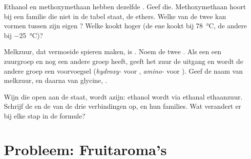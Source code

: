 \begin{exercise}[$\star\star\star$]\label{exo:g11:functional-groups:13}
Ethanol  en methoxymethaan  hebben dezelfde
. Geef die. Methoxymethaan hoort bij een familie die niet
in de tabel staat, de ethers. Welke van de twee kan 
vormen tussen zijn eigen ? Welke kookt hoger (de ene kookt bij
\qty{78}{\celsius}, de andere bij \qty{-25}{\celsius})?
\end{exercise}

\begin{exercise}[$\star\star\star$]\label{exo:g11:functional-groups:14}
Melkzuur, dat vermoeide spieren maken, is
. Noem de twee . Als
een  een zuurgroep en nog een andere groep heeft, geeft het zuur
de uitgang en wordt de andere groep een voorvoegsel (\emph{hydroxy-} voor
, \emph{amino-} voor ). Geef de naam van melkzuur, en
daarna van glycine, .
\end{exercise}

\begin{exercise}[$\star\star\star$]\label{exo:g11:functional-groups:15}
Wijn die open aan de  staat, wordt azijn: ethanol wordt via ethanal
ethaanzuur. Schrijf de  en de 
van de drie verbindingen op, en hun families. Wat verandert er bij elke
stap in de formule?
\end{exercise}

\section{Probleem: Fruitaroma's}

